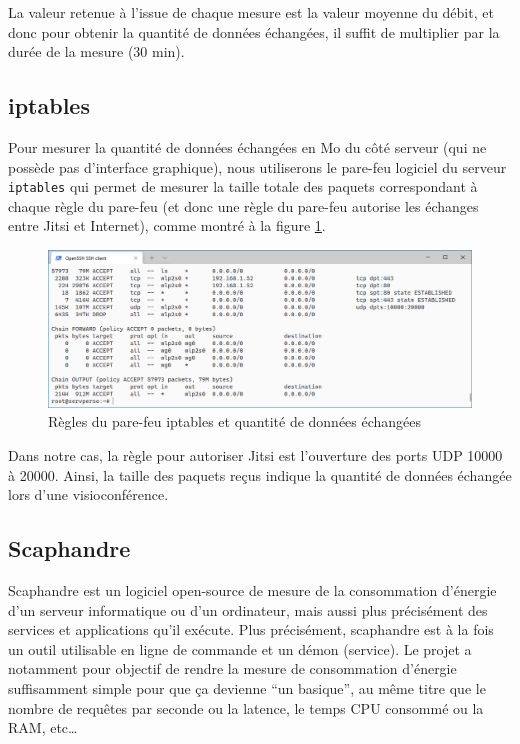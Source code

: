 \documentclass[11pt,a4paper]{report}
\begin{document}
La valeur retenue à l'issue de chaque mesure est la valeur moyenne du débit, et donc pour obtenir la quantité de données échangées, il suffit de multiplier par la durée de la mesure (30 min).

\subsection{iptables}
Pour mesurer la quantité de données échangées en Mo du côté serveur (qui ne possède pas d'interface graphique), nous utiliserons le pare-feu logiciel du serveur \texttt{iptables} qui permet de mesurer la taille totale des paquets correspondant à chaque règle du pare-feu (et donc une règle du pare-feu autorise les échanges entre Jitsi et Internet), comme montré à la figure \ref{fig:iptables}.
\begin{figure}[!h]
    \centering
    \includegraphics[scale=0.5]{iptables.PNG}
    \caption{Règles du pare-feu iptables et quantité de données échangées}
    \label{fig:iptables}
\end{figure}

Dans notre cas, la règle pour autoriser Jitsi est l'ouverture des ports UDP 10000 à 20000. Ainsi, la taille des paquets reçus indique la quantité de données échangée lors d'une visioconférence.


\subsection{Scaphandre}
Scaphandre est un logiciel open-source de mesure de la consommation d'énergie d'un serveur informatique ou d'un ordinateur, mais aussi plus précisément des services et applications qu'il exécute. Plus précisément, scaphandre est à la fois un outil utilisable en ligne de commande et un démon (service).
Le projet a notamment pour objectif de rendre la mesure de consommation d'énergie suffisamment simple pour que ça devienne “un basique”, au même titre que le nombre de requêtes par seconde ou la latence, le temps CPU consommé ou la RAM, etc…
\end{document}

